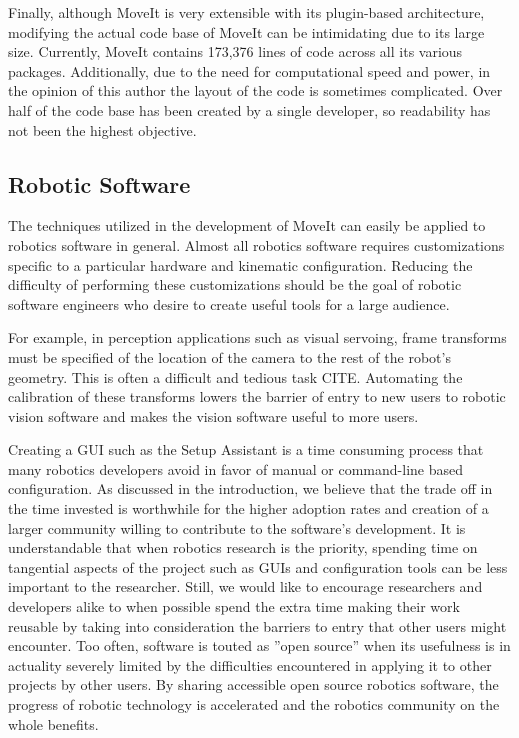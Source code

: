 \documentclass[10pt,journal,compsoc]{joser1}
\begin{document}
{Finally, although MoveIt is very extensible with its plugin-based architecture, modifying the actual code base of MoveIt can be intimidating due to its large size. Currently, MoveIt contains 173,376	lines of code across all its various packages. Additionally, due to the need for computational speed and power, in the opinion of this author the layout of the code is sometimes complicated. Over half of the code base has been created by a single developer, so readability has not been the highest objective. 

\subsection{Robotic Software}
\label{sec::robotic_discussion}

The techniques utilized in the development of MoveIt can easily be applied to robotics software in general. Almost all robotics software requires customizations specific to a particular hardware and kinematic configuration. Reducing the difficulty of performing these customizations should be the goal of robotic software engineers who desire to create useful tools for a large audience. 

For example, in perception applications such as visual servoing, frame transforms must be specified of the location of the camera to the rest of the robot's geometry. This is often a difficult and tedious task CITE. Automating the calibration of these transforms lowers the barrier of entry to new users to robotic vision software and makes the vision software useful to more users.

Creating a GUI such as the Setup Assistant is a time consuming process that many robotics developers avoid in favor of manual or command-line based configuration. As discussed in the introduction, we believe that the trade off in the time invested is worthwhile for the higher adoption rates and creation of a larger community willing to contribute to the software's development. It is understandable that when robotics research is the priority, spending time on tangential aspects of the project such as GUIs and configuration tools can be less important to the researcher. Still, we would like to encourage researchers and developers alike to when possible spend the extra time making their work reusable by taking into consideration the barriers to entry that other users might encounter. Too often, software is touted as ''open source'' when its usefulness is in actuality severely limited by the difficulties encountered in applying it to other projects by other users. By sharing accessible open source robotics software, the progress of robotic technology is accelerated and the robotics community on the whole benefits.

}
\end{document}
